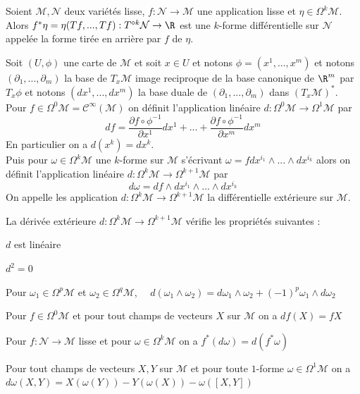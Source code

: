 \begin{defi}
Soient $\mathcal{M}, \mathcal{N}$ deux variétés lisse, $f:\mathcal{N} \to \mathcal{M}$ une application lisse et $\eta \in \Omega^k\mathcal{M}$. Alors $f^*\eta = \eta (Tf, ..., Tf) : T^{\diamond k}\mathcal{N} \to \R$ est une $k$-forme différentielle sur $\mathcal{N}$ appelée la forme tirée en arrière par $f$ de $\eta$. \\
\end{defi}

\begin{defi}
Soit $(U, \phi)$ une carte de $\mathcal{M}$ et soit $x\in U$ et notons $\phi = (x^1, ..., x^m)$ et notons $(\partial_1, ..., \partial_m)$ la base de $T_x\mathcal{M}$ image reciproque de la base canonique de $\R^m$ par $T_x\phi$ et notons $(dx^1, ..., dx^m)$ la base duale de $(\partial_1, ..., \partial_m)$ dans $(T_x\mathcal{M})^*$. Pour $f\in \Omega^0\mathcal{M} = \mathscr{C}^\infty(\mathcal{M})$ on définit l'application linéaire $d : \Omega^0\mathcal{M} \to \Omega^1\mathcal{M}$ par 
$$df = \frac{\partial f \circ \phi^{-1}}{\partial x^1}dx^1 +...+ \frac{\partial f \circ \phi^{-1}}{\partial x^m}dx^m$$
En particulier on a $d(x^k) = dx^k$. \\
Puis pour $\omega \in \Omega^k\mathcal{M}$ une $k$-forme sur $\mathcal{M}$ s'écrivant $\omega = f dx^{i_1} \wedge ... \wedge dx^{i_k}$ alors on définit l'application linéaire $d: \Omega^k\mathcal{M} \to \Omega^{k+1}\mathcal{M}$ par 
$$d\omega = df \wedge dx^{i_1} \wedge ... \wedge dx^{i_k}$$
On appelle les application $d: \Omega^k\mathcal{M} \to \Omega^{k+1}\mathcal{M}$ la différentielle extérieure sur $\mathcal{M}$.
\end{defi}

\begin{pro}
La dérivée extérieure $d: \Omega^k\mathcal{M} \to \Omega^{k+1}\mathcal{M}$ vérifie les propriétés suivantes :
\be
	\item $d$ est linéaire
	\item $d^2 = 0$ 
	\item Pour $\omega_1 \in \Omega^p\mathcal{M}$ et $\omega_2 \in \Omega^q\mathcal{M}$, $\quad d(\omega_1 \wedge \omega_2) = d\omega_1 \wedge \omega_2 + (-1)^p\omega_1 \wedge d\omega_2$
	\item Pour $f\in \Omega^0\mathcal{M}$ et pour tout champs de vecteurs $X$ sur $\mathcal{M}$ on a $df(X) = fX$
	\item Pour $f:\mathcal{N} \to \mathcal{M}$ lisse et pour $\omega \in \Omega^k\mathcal{M}$ on a $f^*(d\omega) = d(f^*\omega)$
	\item Pour tout champs de vecteurs $X,Y$ sur $\mathcal{M}$ et pour toute $1$-forme $\omega \in \Omega^1\mathcal{M}$ on a $d\omega(X,Y) = X(\omega(Y)) - Y(\omega(X)) - \omega([X, Y])$
\ee
\end{pro}

